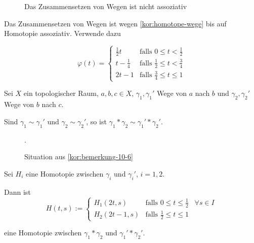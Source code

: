 \begin{beweis}
    \begin{figure}[ht]
        \centering

        \label{fig:assoziativitaet-von-wegen}
        \caption{Das Zusammensetzen von Wegen ist nicht assoziativ}
    \end{figure}

    Das Zusammensetzen von Wegen ist wegen \cref{kor:homotope-wege}
    bis auf Homotopie assoziativ. Verwende dazu

    \[\varphi(t) = \begin{cases}
            \frac{1}{2} t   &\text{falls } 0 \leq t < \frac{1}{2}\\
            t - \frac{1}{4} &\text{falls } \frac{1}{2} \leq t < \frac{3}{4}\\
            2t - 1          &\text{falls } \frac{3}{4} \leq t \leq 1
        \end{cases}\]
\end{beweis}

\begin{bemerkung}\label{kor:bemerkung-10-6}
    Sei $X$ ein topologischer Raum, $a,b,c \in X$, $\gamma_1, \gamma_1'$
    Wege von $a$ nach $b$ und $\gamma_2, \gamma_2'$ Wege von $b$ nach $c$.

    Sind $\gamma_1 \sim \gamma_1'$ und $\gamma_2 \sim \gamma_2'$, so
    ist $\gamma_1 * \gamma_2 \sim \gamma_1 ' * \gamma_2'$.
\end{bemerkung}

\begin{figure}[htp]
    \centering
    
    \caption{Situation aus \cref{kor:bemerkung-10-6}}.
    \label{fig:situation-bemerkung-10-6}
\end{figure}

\begin{beweis}
    Sei $H_i$ eine Homotopie zwischen $\gamma_i$ und $\gamma_i'$,
    $i=1,2$.

    Dann ist 
    \[H(t,s) := \begin{cases}
        H_1(2t, s)  &\text{falls } 0 \leq t \leq \frac{1}{2}\;\;\;\forall s \in I\\
        H_2(2t-1,s) &\text{falls } \frac{1}{2} \leq t \leq 1
    \end{cases}\]

    eine Homotopie zwischen 
    $\gamma_1 * \gamma_2$ und $\gamma_1' * \gamma_2 '$.
\end{beweis}


